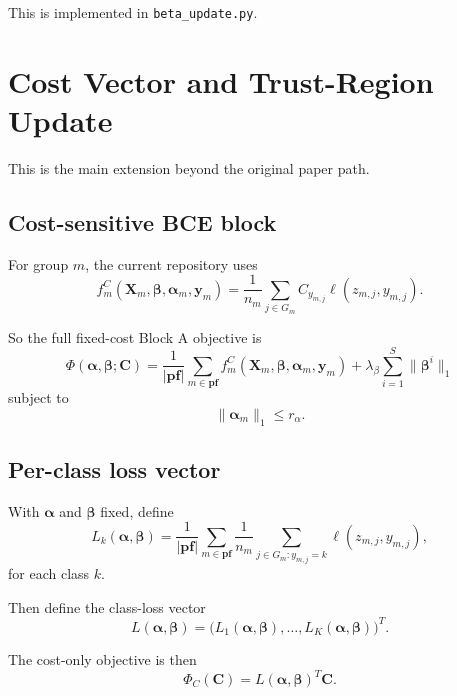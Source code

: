 \documentclass[11pt]{article}
\newcommand{\pf}{\mathbf{pf}}
\newcommand{\Xm}{\mathbf{X}_m}
\newcommand{\ym}{\mathbf{y}_m}
\newcommand{\alpham}{\boldsymbol{\alpha}_m}
\newcommand{\betai}{\boldsymbol{\beta}^i}
\newcommand{\betavec}{\boldsymbol{\beta}}
\newcommand{\alphavec}{\boldsymbol{\alpha}}
\newcommand{\costvec}{\mathbf{C}}
\begin{document}
This is implemented in \texttt{beta\_update.py}.

\section{Cost Vector and Trust-Region Update}

This is the main extension beyond the original paper path.

\subsection{Cost-sensitive BCE block}

For group $m$, the current repository uses
\begin{equation}
\label{eq:cost-sensitive-group-loss}
f_m^C(\Xm, \betavec, \alpham, \ym)
=
\frac{1}{n_m}
\sum_{j \in G_m}
C_{y_{m,j}}
\ell(z_{m,j}, y_{m,j}).
\end{equation}

So the full fixed-cost Block A objective is
\begin{equation}
\label{eq:block-a-objective}
\Phi(\alphavec, \betavec; \costvec)
=
\frac{1}{|\pf|}
\sum_{m \in \pf}
f_m^C(\Xm, \betavec, \alpham, \ym)
+
\lambda_{\beta}
\sum_{i=1}^{S} \|\betai\|_1
\end{equation}
subject to
\begin{equation}
\label{eq:block-a-constraint}
\|\alpham\|_1 \le r_{\alpha}.
\end{equation}

\subsection{Per-class loss vector}

With $\alphavec$ and $\betavec$ fixed, define
\begin{equation}
\label{eq:classwise-loss}
L_k(\alphavec, \betavec)
=
\frac{1}{|\pf|}
\sum_{m \in \pf}
\frac{1}{n_m}
\sum_{j \in G_m : y_{m,j}=k}
\ell(z_{m,j}, y_{m,j}),
\end{equation}
for each class $k$.

Then define the class-loss vector
\begin{equation}
\label{eq:class-loss-vector}
L(\alphavec, \betavec)
=
\big(
L_1(\alphavec, \betavec),
\dots,
L_K(\alphavec, \betavec)
\big)^T.
\end{equation}

The cost-only objective is then
\begin{equation}
\label{eq:phi-c}
\Phi_C(\costvec)
=
L(\alphavec, \betavec)^T \costvec.
\end{equation}
\end{document}
